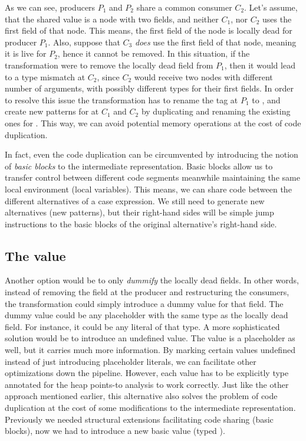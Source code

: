 \documentclass[main.tex]{subfiles}
\begin{document}
	As we can see, producers $P_1$ and $P_2$ share a common consumer $C_2$. Let's assume, that the shared value is a  node with two fields, and neither $C_1$, nor $C_2$ uses the first field of that node. This means, the first field of the  node is locally dead for producer $P_1$. Also, suppose that $C_3$ \emph{does} use the first field of that node, meaning it is live for $P_2$, hence it cannot be removed. In this situation, if the transformation were to remove the locally dead field from $P_1$, then it would lead to a type mismatch at $C_2$, since $C_2$ would receive two  nodes with different number of arguments, with possibly different types for their first fields. In order to resolve this issue the transformation has to rename the tag at $P_1$ to , and create new patterns for  at $C_1$ and $C_2$ by duplicating and renaming the existing ones for . This way, we can avoid potential memory operations at the cost of code duplication.
	
	In fact, even the code duplication can be circumvented by introducing the notion of \emph{basic blocks} to the intermediate representation. Basic blocks allow us to transfer control between different code segments meanwhile maintaining the same local environment (local variables). This means, we can share code between the different alternatives of a case expression. We still need to generate new alternatives (new patterns), but their right-hand sides will be simple jump instructions to the basic blocks of the original alternative's right-hand side.
	
	\subsection{The  value}
	\label{subsec:undefined}
	
	Another option would be to only \emph{dummify} the locally dead fields. In other words, instead of removing the field at the producer and restructuring the consumers, the transformation could simply introduce a dummy value for that field. The dummy value could be any placeholder with the same type as the locally dead field. For instance, it could be any literal of that type. A more sophisticated solution would be to introduce an undefined value. The  value is a placeholder as well, but it carries much more information. By marking certain values undefined instead of just introducing placeholder literals, we can facilitate other optimizations down the pipeline. However, each  value has to be explicitly type annotated for the heap points-to analysis to work correctly. Just like the other approach mentioned earlier, this alternative also solves the problem of code duplication at the cost of some modifications to the intermediate representation. Previously we needed structural extensions facilitating code sharing (basic blocks), now we had to introduce a new basic value (typed ).
	
\end{document}

